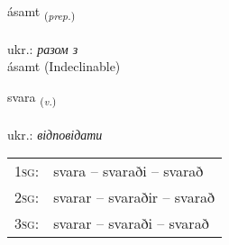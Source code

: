 \documentclass[frontgrid, backgrid]{flacards}\usepackage[]{graphicx}\usepackage[]{xcolor}
\begin{document}

\renewcommand{\flhead}{\vskip5pt \fboxsep=0pt {\small\bfseries\footnotesize Forsetning | прийменник}}
\renewcommand{\fcfoot}{\vskip5pt \fboxsep=0pt \hspace{2pt}{\small\bfseries\footnotesize 1K}}

\renewcommand{\blhead}{\vskip5pt {\small\bfseries\footnotesize Forsetning | прийменник }}
\renewcommand{\bcfoot}{\vskip5pt \hspace{2pt}{\small\bfseries\footnotesize 1K}}


{ásamt \small{\textsubscript{(\textit{prep.})}} \\[1ex]
\textphonetic{[auːsam̥t]} \\
ukr.: \emph{разом з} \\  [2ex]
ásamt (Indeclinable)}

\renewcommand{\flhead}{\vskip5pt \fboxsep=0pt {\small\bfseries\footnotesize Sagnorð | дієслово}}
\renewcommand{\fcfoot}{\vskip5pt \fboxsep=0pt \hspace{2pt}{\small\bfseries\footnotesize 1K}}

\renewcommand{\blhead}{\vskip5pt {\small\bfseries\footnotesize Sagnorð | дієслово }}
\renewcommand{\bcfoot}{\vskip5pt \hspace{2pt}{\small\bfseries\footnotesize 1K}}


{svara \small{\textsubscript{(\textit{v.})}} \\[1ex] %
\textphonetic{[svaːra]} \\
ukr.: \emph{відповідати} \\  [2ex]
\renewcommand*{\arraystretch}{0.8}
\begin{tabular}{p{1cm}l}
\textsc{1sg}: & svara -- svaraði -- svarað \\ 
\textsc{2sg}: & svarar -- svaraðir -- svarað \\ 
\textsc{3sg}: & svarar -- svaraði -- svarað \\ 
\end{tabular}
}
\end{document}
